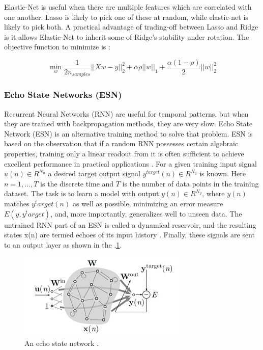 \documentclass[review,authoryear,english]{elsarticle}
\begin{document}
Elastic-Net is useful when there are multiple features which are correlated with one another. Lasso is likely to pick one of these at random, while elastic-net is likely to pick both.
A practical advantage of trading-off between Lasso and Ridge is it allows Elastic-Net to inherit some of Ridge’s stability under rotation. The objective function to minimize is \citep{scikitlearn2011}:

$$\min_{w} { \frac{1}{2n_{samples}} \Bigr| \Bigr| Xw - y \Bigr| \Bigr|_2^2  + \alpha \rho \Bigr| \Bigr| w \Bigr| \Bigr|_1 + \frac{\alpha (1- \rho)}{2} \Bigr| \Bigr| w \Bigr| \Bigr|_2^2 } $$

\subsubsection{Echo State Networks (ESN)}
Recurrent Neural Networks (RNN) are useful for temporal patterns, but when they are trained with backpropagation methods, they are very slow.  Echo State Network (ESN) is an alternative training method to solve that problem.  ESN is based on the observation that if a random RNN possesses certain algebraic properties, training only a linear readout from it is often sufficient to achieve excellent performance in practical applications \citep{Lukose2009}. 
For a given training input signal $u(n)  \in R^{N_u}$ a desired target output signal $y^{target}(n) \in R^{N_y}$
is known. Here $n = 1, . . . ,T$ is the discrete time and $T$ is the number of data points in the training dataset. The task is to learn a model with output $y(n) \in R^{N_y}$, where $y(n)$ matches $y^target(n)$ as well as possible, minimizing an error measure $E(y,y^target)$, and, more importantly, generalizes well to unseen data. The untrained RNN part of an ESN is called a dynamical reservoir, and the resulting states x(n) are termed echoes of its input history \citep{Lukose2012}. Finally, these signals are sent to an output layer as shown in the \figurename
$.$\ref{figura3}.
\begin{figure}[h] 
 \centering
 \includegraphics[scale=.9]{Reservorio}
 \caption{An echo state network \citep{Lukose2012}.} 
 \label{figura3} 
\end{figure}
 
\end{document}
